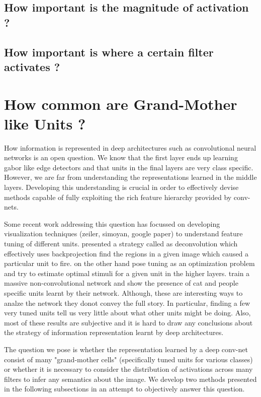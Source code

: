 \documentclass[runningheads]{llncs}
\begin{document}
\subsection{How important is the magnitude of activation ?}
\label{sub:imp-mag}

\subsection{How important is where a certain filter activates ?}
\label{sub:imp-loc}




\section{How common are Grand-Mother like Units ?}
How information is represented in deep architectures such as convolutional neural networks is an open question. We know that the first layer ends up learning gabor like edge detectors and that units in the final layers are very class specific. However, we are far from understanding the representations learned in the middle layers. Developing this understanding is crucial in order to effectively devise methods capable of fully exploiting the rich feature hierarchy provided by conv-nets.

Some recent work addressing this question has focussed on developing visualization techniques (zeiler, simoyan, google paper) to understand feature tuning of different units. \cite{zeiler} presented a strategy called as deconvolution which effectively uses backprojection find the regions in a given image which caused a particular unit to fire.  \cite{simoyan} on the other hand pose tuning as an optimization problem and try to estimate optimal stimuli for a given unit in the higher layers. \cite{google} train a massive non-convolutional network and show the presence of cat and people specific units learnt by their network.  Although, these are interesting ways to analze the network they donot convey the full story. In particular, finding a few very tuned units tell us very little about what other units might be doing. Also, most of these results are subjective and it is hard to draw any conclusions about the strategy of information representation learnt by deep architectures. 

The question we pose is whether the representation learned by a deep conv-net consist of many "grand-mother cells" (specifically tuned units for various classes) or whether it is necessary to consider the distribution of activations across many filters to infer any semantics about the image. We develop two methods presented in the following subsections in an attempt to objectively answer this question.
\end{document}
